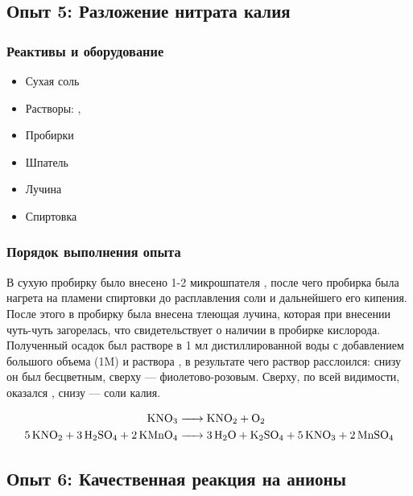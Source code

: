 \documentclass[a4paper, 12pt]{article}
\begin{document}
\subsection{Опыт 5: Разложение нитрата калия}

\subsubsection{Реактивы и оборудование}

\begin{itemize}
	\item Сухая соль 
	
	\item Растворы: , 
	
	\item Пробирки
	
	\item Шпатель
	
	\item Лучина
	
	\item Спиртовка
\end{itemize}

\subsubsection{Порядок выполнения опыта}

В сухую пробирку было внесено 1-2 микрошпателя , после чего пробирка была нагрета на пламени спиртовки до расплавления соли и дальнейшего его кипения. После этого в пробирку была внесена тлеющая лучина, которая при внесении чуть-чуть загорелась, что свидетельствует о наличии в пробирке кислорода. Полученный осадок был растворе в 1 мл дистиллированной воды с добавлением большого объема  (1M) и раствора , в результате чего раствор расслоился: снизу он был бесцветным, сверху --- фиолетово-розовым. Сверху, по всей видимости, оказался , снизу --- соли калия. %

\begin{align}
	\ce{KNO3 &-> KNO2 + O2}\\
	\ce{5 KNO2 + 3 H2SO4 + 2 KMnO4 &-> 3 H2O + K2SO4 + 5 KNO3 + 2 MnSO4}
\end{align}

\subsection{Опыт 6: Качественная реакция на анионы}
\end{document}
